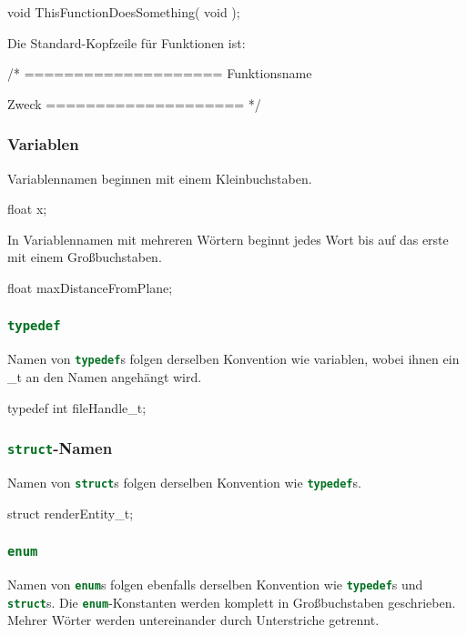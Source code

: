 \documentclass{homework-pp}
\renewcommand{\c}[1]{\lstinline[language=c,basicstyle=\ttfamily]|#1|}
\begin{document}
\begin{cblock}
void ThisFunctionDoesSomething( void );
\end{cblock}

Die Standard-Kopfzeile für Funktionen ist:

\begin{cblock}
/*
====================
Funktionsname

Zweck
====================
*/
\end{cblock}

\subsubsection{Variablen}

Variablennamen beginnen mit einem Kleinbuchstaben.

\begin{cblock}
float x;
\end{cblock}

In Variablennamen mit mehreren Wörtern beginnt jedes Wort bis auf das erste mit einem Großbuchstaben.

\begin{cblock}
float maxDistanceFromPlane;
\end{cblock}

\subsubsection{\c{typedef}}

Namen von \c{typedef}s folgen derselben Konvention wie variablen, wobei ihnen ein \_t an den Namen angehängt wird.

\begin{cblock}
typedef int fileHandle_t;
\end{cblock}

\subsubsection{\c{struct}-Namen}

Namen von \c{struct}s folgen derselben Konvention wie \c{typedef}s.

\begin{cblock}
struct renderEntity_t;
\end{cblock}

\subsubsection{\c{enum}}
Namen von \c{enum}s folgen ebenfalls derselben Konvention wie \c{typedef}s und \c{struct}s. Die \c{enum}-Konstanten werden komplett in Großbuchstaben geschrieben. Mehrer Wörter werden untereinander durch Unterstriche getrennt.
\end{document}
